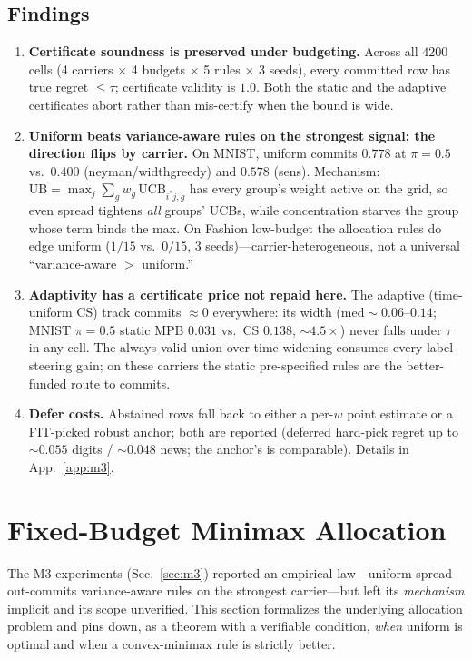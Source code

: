 \documentclass{article}
\begin{document}
\subsection{Findings}
\begin{enumerate}
\item \textbf{Certificate soundness is preserved under budgeting.} Across all $4200$ cells
(4 carriers $\times$ 4 budgets $\times$ 5 rules $\times$ 3 seeds), every committed row has
true regret $\le\tau$; certificate validity is $1.0$. Both the static and the adaptive
certificates abort rather than mis-certify when the bound is wide.
\item \textbf{Uniform beats variance-aware rules on the strongest signal; the direction flips
by carrier.} On MNIST, uniform commits $0.778$ at $\pi{=}0.5$ vs.\ $0.400$ (neyman/widthgreedy)
and $0.578$ (sens). Mechanism: $\mathrm{UB}=\max_j\sum_g w_g\,\mathrm{UCB}_{i^*j,g}$ has every
group's weight active on the grid, so even spread tightens \emph{all} groups' UCBs, while
concentration starves the group whose term binds the max. On Fashion low-budget the
allocation rules do edge uniform ($1/15$ vs.\ $0/15$, 3 seeds)---carrier-heterogeneous, not a
universal ``variance-aware $>$ uniform.''
\item \textbf{Adaptivity has a certificate price not repaid here.} The adaptive (time-uniform
CS) track commits $\approx0$ everywhere: its width ($\mathrm{med}\sim0.06$--$0.14$; MNIST
$\pi{=}0.5$ static MPB $0.031$ vs.\ CS $0.138$, $\sim4.5\times$) never falls under $\tau$ in
any cell. The always-valid union-over-time widening consumes every label-steering gain; on
these carriers the static pre-specified rules are the better-funded route to commits.
\item \textbf{Defer costs.} Abstained rows fall back to either a per-$w$ point estimate or a
FIT-picked robust anchor; both are reported (deferred hard-pick regret up to $\sim0.055$
digits / $\sim0.048$ news; the anchor's is comparable). Details in App.~\ref{app:m3}.
\end{enumerate}

\section{Fixed-Budget Minimax Allocation}
\label{sec:m35}

The M3 experiments (Sec.~\ref{sec:m3}) reported an empirical law---uniform spread
out-commits variance-aware rules on the strongest carrier---but left its \emph{mechanism}
implicit and its scope unverified. This section formalizes the underlying allocation problem
and pins down, as a theorem with a verifiable condition, \emph{when} uniform is optimal and
when a convex-minimax rule is strictly better.
\end{document}
